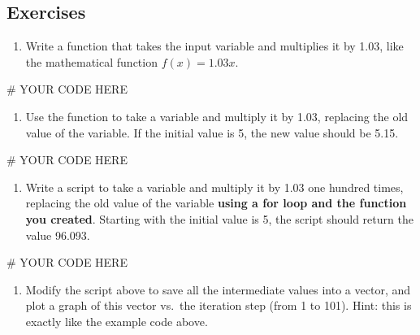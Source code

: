 \documentclass[
  letterpaper,
  DIV=11,
  numbers=noendperiod]{scrreprt}
\newenvironment{Shaded}{\begin{snugshade}}{\end{snugshade}}
\newcommand{\CommentTok}[1]{\textcolor[rgb]{0.37,0.37,0.37}{#1}}
\providecommand{\tightlist}{%
  \setlength{\itemsep}{0pt}\setlength{\parskip}{0pt}}\usepackage{longtable,booktabs,array}
\begin{document}
\hypertarget{exercises-22}{%
\subsection{Exercises}\label{exercises-22}}

\begin{enumerate}
\def\labelenumi{\arabic{enumi}.}
\tightlist
\item
  Write a function that takes the input variable and multiplies it by
  1.03, like the mathematical function \(f(x) = 1.03x\).
\end{enumerate}

\begin{Shaded}
\begin{Highlighting}[]
\CommentTok{\# YOUR CODE HERE}
\end{Highlighting}
\end{Shaded}

\begin{enumerate}
\def\labelenumi{\arabic{enumi}.}
\setcounter{enumi}{1}
\tightlist
\item
  Use the function to take a variable and multiply it by 1.03, replacing
  the old value of the variable. If the initial value is 5, the new
  value should be 5.15.
\end{enumerate}

\begin{Shaded}
\begin{Highlighting}[]
\CommentTok{\# YOUR CODE HERE}
\end{Highlighting}
\end{Shaded}

\begin{enumerate}
\def\labelenumi{\arabic{enumi}.}
\setcounter{enumi}{2}
\tightlist
\item
  Write a script to take a variable and multiply it by 1.03 one hundred
  times, replacing the old value of the variable \textbf{using a for
  loop and the function you created}. Starting with the initial value is
  5, the script should return the value 96.093.
\end{enumerate}

\begin{Shaded}
\begin{Highlighting}[]
\CommentTok{\# YOUR CODE HERE}
\end{Highlighting}
\end{Shaded}

\begin{enumerate}
\def\labelenumi{\arabic{enumi}.}
\setcounter{enumi}{3}
\tightlist
\item
  Modify the script above to save all the intermediate values into a
  vector, and plot a graph of this vector vs.~the iteration step (from 1
  to 101). Hint: this is exactly like the example code above.
\end{enumerate}
\end{document}
